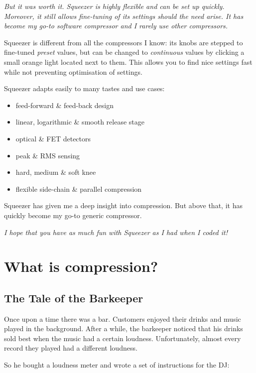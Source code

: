 \emph{But it was worth it.  Squeezer is highly flexible and can be set
  up quickly.  Moreover, it still allows fine-tuning of its settings
  should the need arise.  It has become my go-to software compressor
  and I rarely use other compressors.}

Squeezer is different from all the compressors I know: its knobs are
stepped to fine-tuned \emph{preset} values, but can be changed to
\emph{continuous} values by clicking a small orange light located next
to them.  This allows you to find nice settings fast while not
preventing optimisation of settings.

Squeezer adapts easily to many tastes and use cases:

\begin{itemize}
\item feed-forward \& feed-back design
\item linear, logarithmic \& smooth release stage
\item optical \& FET detectors
\item peak \& RMS sensing
\item hard, medium \& soft knee
\item flexible side-chain \& parallel compression
\end{itemize}

Squeezer has given me a deep insight into compression.  But above
that, it has quickly become my go-to generic compressor.

\emph{I hope that you have as much fun with Squeezer as I had when I
  coded it!}

\chapter{What is compression?}
\label{chap:what_is_compression}

\section{The Tale of the Barkeeper}
\label{sec:compression_tale_of_barkeeper}

Once upon a time there was a bar.  Customers enjoyed their drinks and
music played in the background.  After a while, the barkeeper noticed
that his drinks sold best when the music had a certain loudness.
Unfortunately, almost every record they played had a different
loudness.

So he bought a loudness meter and wrote a set of instructions for the
DJ:

